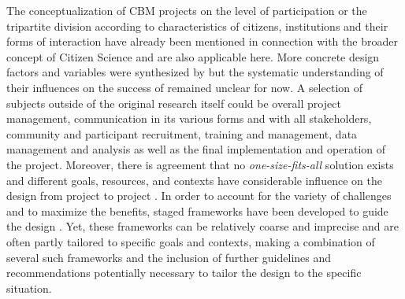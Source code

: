 {%
The conceptualization of CBM projects on the level of participation or the tripartite division according to characteristics of citizens, institutions and their forms of interaction have already been mentioned in connection with the broader concept of Citizen Science and are also applicable here. More concrete design factors and variables were synthesized by \autocite{kirschkeCitizenScienceProjects2022} but the systematic understanding of their influences on the success of remained unclear for now. A selection of subjects outside of the original research itself could be overall project management, communication in its various forms and with all stakeholders, community and participant recruitment, training and management, data management and analysis as well as the final implementation and operation of the project. Moreover, there is agreement that no \textit{one-size-fits-all} solution exists and different goals, resources, and contexts have considerable influence on the design from project to project \autocite{fraislCitizenScienceEnvironmental2022}. In order to account for the variety of challenges and to maximize the benefits, staged frameworks have been developed to guide the design \autocite{citizenscience.govBasicStepsYour, fraislCitizenScienceEnvironmental2022,garciaFindingWhatYou2021,minkmanCitizenScienceWater2015}. Yet, these frameworks can be relatively coarse and imprecise and are often partly tailored to specific goals and contexts, making a combination of several such frameworks and the inclusion of further guidelines and recommendations potentially necessary to tailor the design to the specific situation. 

}
